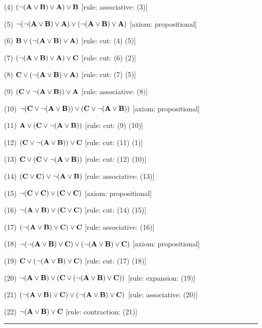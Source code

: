 \item{(4)} $(\neg ({\bf A} \lor {\bf B}) \lor {\bf A}) \lor {\bf B}$ \hfill [rule: associative: (3)]
\item{(5)} $\neg (\neg ({\bf A} \lor {\bf B}) \lor {\bf A}) \lor (\neg ({\bf A} \lor {\bf B}) \lor {\bf A})$ \hfill [axiom: propositional]
\item{(6)} ${\bf B} \lor (\neg ({\bf A} \lor {\bf B}) \lor {\bf A})$ \hfill [rule: cut: (4) (5)]
\item{(7)} $(\neg ({\bf A} \lor {\bf B}) \lor {\bf A}) \lor {\bf C}$ \hfill [rule: cut: (6) (2)]
\item{(8)} ${\bf C} \lor (\neg ({\bf A} \lor {\bf B}) \lor {\bf A})$ \hfill [rule: cut: (7) (5)]
\item{(9)} $({\bf C} \lor \neg ({\bf A} \lor {\bf B})) \lor {\bf A}$ \hfill [rule: associative: (8)]
\item{(10)} $\neg ({\bf C} \lor \neg ({\bf A} \lor {\bf B})) \lor ({\bf C} \lor \neg ({\bf A} \lor {\bf B}))$ \hfill [axiom: propositional]
\item{(11)} ${\bf A} \lor ({\bf C} \lor \neg ({\bf A} \lor {\bf B}))$ \hfill [rule: cut: (9) (10)]
\item{(12)} $({\bf C} \lor \neg ({\bf A} \lor {\bf B})) \lor {\bf C}$ \hfill [rule: cut: (11) (1)]
\item{(13)} ${\bf C} \lor ({\bf C} \lor \neg ({\bf A} \lor {\bf B}))$ \hfill [rule: cut: (12) (10)]
\item{(14)} $({\bf C} \lor {\bf C}) \lor \neg ({\bf A} \lor {\bf B})$ \hfill [rule: associative: (13)]
\item{(15)} $\neg ({\bf C} \lor {\bf C}) \lor ({\bf C} \lor {\bf C})$ \hfill [axiom: propositional]
\item{(16)} $\neg ({\bf A} \lor {\bf B}) \lor ({\bf C} \lor {\bf C})$ \hfill [rule: cut: (14) (15)]
\item{(17)} $(\neg ({\bf A} \lor {\bf B}) \lor {\bf C}) \lor {\bf C}$ \hfill [rule: associative: (16)]
\item{(18)} $\neg (\neg ({\bf A} \lor {\bf B}) \lor {\bf C}) \lor (\neg ({\bf A} \lor {\bf B}) \lor {\bf C})$ \hfill [axiom: propositional]
\item{(19)} ${\bf C} \lor (\neg ({\bf A} \lor {\bf B}) \lor {\bf C})$ \hfill [rule: cut: (17) (18)]
\item{(20)} $\neg ({\bf A} \lor {\bf B}) \lor ({\bf C} \lor (\neg ({\bf A} \lor {\bf B}) \lor {\bf C}))$ \hfill [rule: expansion: (19)]
\item{(21)} $(\neg ({\bf A} \lor {\bf B}) \lor {\bf C}) \lor (\neg ({\bf A} \lor {\bf B}) \lor {\bf C})$ \hfill [rule: associative: (20)]
\item{(22)} $\neg ({\bf A} \lor {\bf B}) \lor {\bf C}$ \hfill [rule: contraction: (21)]
\medskip
\hrule
\medskip

\vfill
\break


